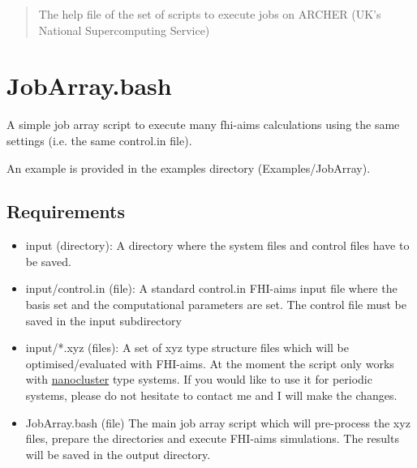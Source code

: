 \documentclass[12pt]{article}
\begin{document}
\maketitle

\begin{abstract}
The help file of the set of scripts to execute jobs on ARCHER (UK's National Supercomputing Service)
\end{abstract}

\section{JobArray.bash}

A simple job array script to execute many fhi-aims calculations using the same settings (i.e. the same control.in file).

An example is provided in the examples directory (Examples/JobArray).

\subsection{Requirements}

\begin{itemize}

  \item input (directory):
  A directory where the system files and control files have to be saved.
  
  \item input/control.in (file):
  A standard control.in FHI-aims input file where the basis set and the computational parameters are set. The control file must be saved in the input subdirectory
  
  \item input/*.xyz (files):
  A set of xyz type structure files which will be optimised/evaluated with FHI-aims. At the moment the script only works with \underline{nanocluster} type systems. If you would like to use it for periodic systems, please do not hesitate to contact me and I will make the changes.
  
  \item JobArray.bash (file)
  The main job array script which will pre-process the xyz files, prepare the directories and execute FHI-aims simulations. The results will be saved in the output directory. 
   
\end{itemize}
\end{document}

